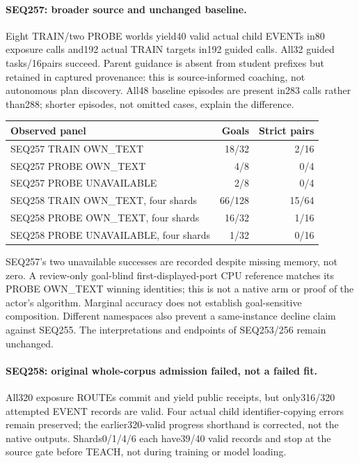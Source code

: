 \documentclass[11pt]{article}
\begin{document}
\paragraph{SEQ257: broader source and unchanged baseline.}
Eight TRAIN/two PROBE worlds yield40 valid actual child EVENTs in80 exposure
calls and192 actual TRAIN targets in192 guided calls. All32 guided tasks/16pairs
succeed. Parent guidance is absent from student prefixes but retained in captured
provenance: this is source-informed coaching, not autonomous plan discovery.
All48 baseline episodes are present in283 calls rather than288; shorter episodes,
not omitted cases, explain the difference.
\begin{center}
\small
\begin{tabular}{lrr}
\toprule
Observed panel & Goals & Strict pairs \\
\midrule
SEQ257 TRAIN OWN\_TEXT & 18/32 & 2/16 \\
SEQ257 PROBE OWN\_TEXT & 4/8 & 0/4 \\
SEQ257 PROBE UNAVAILABLE & 2/8 & 0/4 \\
SEQ258 TRAIN OWN\_TEXT, four shards & 66/128 & 15/64 \\
SEQ258 PROBE OWN\_TEXT, four shards & 16/32 & 1/16 \\
SEQ258 PROBE UNAVAILABLE, four shards & 1/32 & 0/16 \\
\bottomrule
\end{tabular}
\end{center}
SEQ257's two unavailable successes are recorded despite missing memory, not zero.
A review-only goal-blind first-displayed-port CPU reference matches its PROBE
OWN\_TEXT winning identities; this is not a native arm or proof of the actor's
algorithm. Marginal accuracy does not establish goal-sensitive composition.
Different namespaces also prevent a same-instance decline claim against SEQ255.
The interpretations and endpoints of SEQ253/256 remain unchanged.

\paragraph{SEQ258: original whole-corpus admission failed, not a failed fit.}
All320 exposure ROUTEs commit and yield public receipts, but only316/320 attempted
EVENT records are valid. Four actual child identifier-copying errors remain
preserved; the earlier320-valid progress shorthand is corrected, not the native
outputs. Shards0/1/4/6 each have39/40 valid records and stop at the source gate
before TEACH, not during training or model loading.
\end{document}
